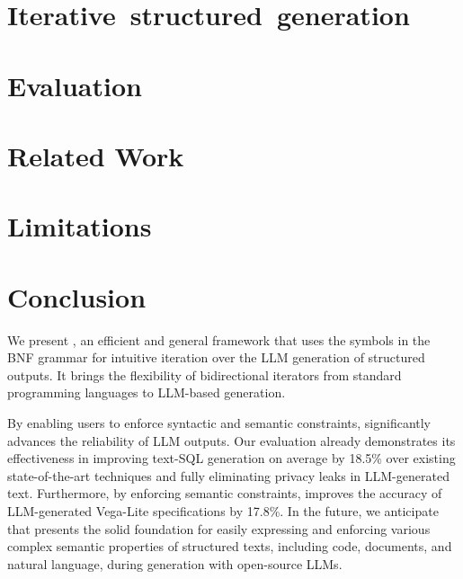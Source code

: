 \documentclass{article}
\begin{document}
\section{\mbox{Iterative structured generation}}
\vspace{-.05in}


% 
\vspace{-.15in}

\section{Evaluation}


\vspace{-.15in}

\section{Related Work}
\label{sec:related}


\vspace{-.05in}
\section{Limitations}
\vspace{-.15in}


\vspace{-.1in}
\section{Conclusion}
\vspace{-.1in}
We present \Tool{}, an efficient and general framework that uses the symbols in the BNF grammar for intuitive iteration over the LLM generation of structured outputs. It brings the flexibility of bidirectional iterators from standard programming languages to LLM-based generation. 

By enabling users to enforce syntactic and semantic constraints, \Tool{} significantly advances {the reliability of LLM outputs.} 
%
Our evaluation already demonstrates its effectiveness in improving text-SQL generation on average by 18.5\% over existing state-of-the-art techniques and fully eliminating privacy leaks in LLM-generated text. 
Furthermore, by enforcing semantic constraints, \Tool{} improves the accuracy of LLM-generated Vega-Lite specifications by 17.8\%.
%
In the future, we anticipate that \Tool{} presents the solid foundation for easily expressing and enforcing various complex semantic properties of structured texts, including code, documents, and natural language, during generation with open-source LLMs. 
\end{document}

